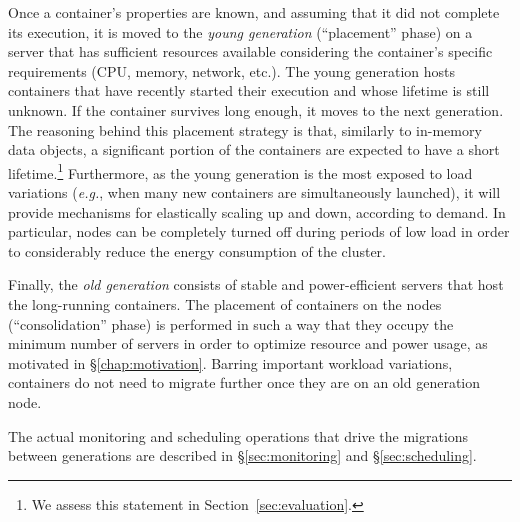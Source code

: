 Once a container's properties are known, and assuming that it did not complete its execution, it is moved to the \emph{young generation} (``placement'' phase) on a server that has sufficient resources available considering the container's specific requirements (CPU, memory, network, etc.).
The young generation hosts containers that have recently started their execution and whose lifetime is still unknown.
If the container survives long enough, it moves to the next generation.
The reasoning behind this placement strategy is that, similarly to in-memory data objects, a significant portion of the containers are expected to have a short lifetime.\footnote{We assess this statement in Section~\ref{sec:evaluation}.}
Furthermore, as the young generation is the most exposed to load variations (\textit{e.g.}, when many new containers are simultaneously launched), it will provide mechanisms for elastically scaling up and down, according to demand.
In particular, nodes can be completely turned off during periods of low load in order to considerably reduce the energy consumption of the cluster.

Finally, the \emph{old generation} consists of stable and power-efficient servers that host the long-running containers.
The placement of containers on the nodes (``consolidation'' phase) is performed in such a way that they occupy the minimum number of servers in order to optimize resource and power usage, as motivated in \S\ref{chap:motivation}.
Barring important workload variations, containers do not need to migrate further once they are on an old generation node.

The actual monitoring and scheduling operations that drive the migrations between generations are described in \S\ref{sec:monitoring} and \S\ref{sec:scheduling}.
